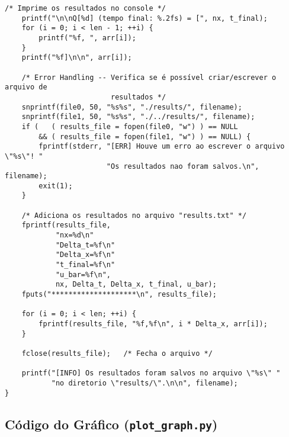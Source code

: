 \begin{Verbatim}[fontsize=\footnotesize]
    /* Imprime os resultados no console */
    printf("\n\nQ[%d] (tempo final: %.2fs) = [", nx, t_final);
    for (i = 0; i < len - 1; ++i) {
        printf("%f, ", arr[i]);
    }
    printf("%f]\n\n", arr[i]);

    /* Error Handling -- Verifica se é possível criar/escrever o arquivo de
                         resultados */
    snprintf(file0, 50, "%s%s", "./results/", filename);
    snprintf(file1, 50, "%s%s", "./../results/", filename);
    if (   ( results_file = fopen(file0, "w") ) == NULL
        && ( results_file = fopen(file1, "w") ) == NULL) {
        fprintf(stderr, "[ERR] Houve um erro ao escrever o arquivo \"%s\"! "
                        "Os resultados nao foram salvos.\n", filename);
        exit(1);
    }

    /* Adiciona os resultados no arquivo "results.txt" */
    fprintf(results_file,
            "nx=%d\n"
            "Delta_t=%f\n"
            "Delta_x=%f\n"
            "t_final=%f\n"
            "u_bar=%f\n",
            nx, Delta_t, Delta_x, t_final, u_bar);
    fputs("********************\n", results_file);

    for (i = 0; i < len; ++i) {
        fprintf(results_file, "%f,%f\n", i * Delta_x, arr[i]);
    }

    fclose(results_file);   /* Fecha o arquivo */

    printf("[INFO] Os resultados foram salvos no arquivo \"%s\" "
           "no diretorio \"results/\".\n\n", filename);
}
\end{Verbatim}

\subsection{Código do Gráfico (\texttt{plot\_graph.py})}

